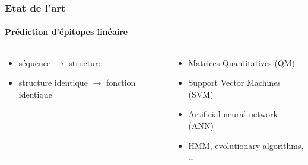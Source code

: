 \documentclass[11pt, notes]{beamer}
\begin{document}
\begin{frame}
\frametitle{Etat de l'art}
\framesubtitle{Prédiction d'épitopes linéaire}
\begin{columns}[c]
	\begin{column}[c]{5cm}
		\begin{itemize}[<+->]
			\item séquence $\rightarrow$ structure
			\item structure identique $\rightarrow$ fonction identique
		\end{itemize}
	\end{column}
	\begin{column}[c]{5cm}
		\begin{itemize}[<+->]
			\item Matrices Quantitatives (QM)
			\item Support Vector Machines (SVM)
			\item Artificial neural network (ANN)
			\item HMM, evolutionary algorithms, \ldots
		\end{itemize}
	\end{column}
\end{columns}
\end{frame}
\end{document}

